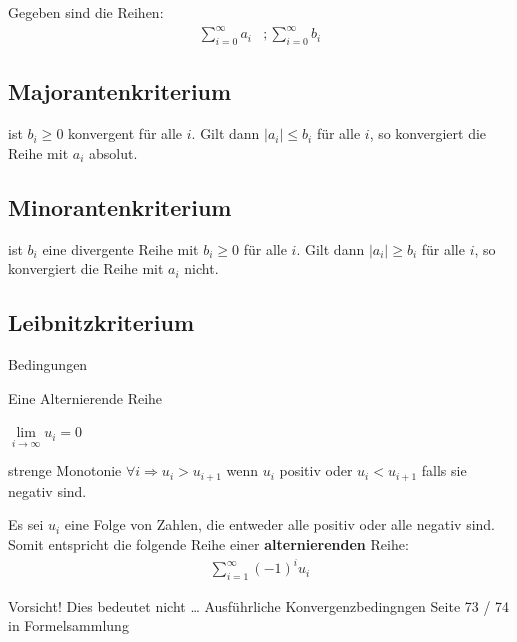 \documentclass[german]{latex4ei/latex4ei_sheet}
\begin{document}
\begin{sectionbox}
Gegeben sind die Reihen:
 \begin{align*}
    \sum_{i=0}^{\infty} a_i  &;  \sum_{i=0}^{\infty} b_i
 \end{align*}
 \subsection{Majorantenkriterium}\label{majorantenkriterium}
 ist $b_i \geq 0$ konvergent für alle $i$. Gilt dann $|a_i| \leq b_i$ für alle $i$, so konvergiert die Reihe mit $a_i$ absolut.
 


\subsection{Minorantenkriterium}\label{minorantenkriterium}
 ist $b_i$ eine divergente Reihe mit $b_i \geq 0$ für alle $i$. Gilt dann $|a_i| \geq b_i$ für alle $i$, so konvergiert die Reihe mit $a_i$ nicht.

\subsection{Leibnitzkriterium}\label{leibnitzkriterium}

\begin{cookbox}{Bedingungen}
    \item Eine Alternierende Reihe
    \item $\lim\limits_{i \rightarrow \infty}{u_i} = 0$
    \item strenge Monotonie $\forall i \Rightarrow u_i > u_{i+1}$ wenn $u_i$ positiv oder $u_i < u_{i+1}$ falls sie negativ sind.
\end{cookbox}
Es sei $u_i$ eine Folge von Zahlen, die entweder alle positiv oder alle negativ sind. Somit entspricht die folgende Reihe einer \textbf{alternierenden} Reihe:
\begin{align*}
    \sum_{i = 1}^{\infty} (-1)^i u_i
\end{align*}

\begin{cookbox}{Vorsicht!}
 Dies bedeutet nicht \dots
 Ausführliche Konvergenzbedingngen Seite 73 / 74 in Formelsammlung 
\end{cookbox}

\end{sectionbox}
\end{document}
